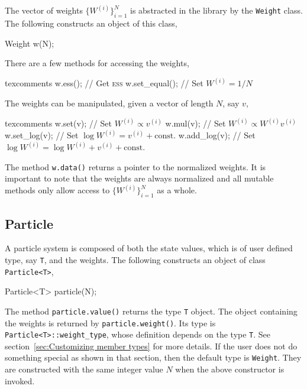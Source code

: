 The vector of weights $\{W^{(i)}\}_{i=1}^N$ is abstracted in the library by the
\verb|Weight| class. The following constructs an object of this class,
\begin{cppcode}
  Weight w(N);
\end{cppcode}
There are a few methods for accessing the weights,
\begin{cppcode*}{texcomments}
  w.ess();          // Get {\normalfont\textsc{ess}}
  w.set_equal();    // Set $W^{(i)} = 1/N$
\end{cppcode*}
The weights can be manipulated, given a vector of length $N$, say $v$,
\begin{cppcode*}{texcomments}
  w.set(v);         // Set $W^{(i)} \propto v^{(i)}$
  w.mul(v);         // Set $W^{(i)} \propto W^{(i)} v^{(i)}$
  w.set_log(v);     // Set $\log W^{(i)} = v^{(i)} + \text{const.}$
  w.add_log(v);     // Set $\log W^{(i)} = \log W^{(i)} + v^{(i)} + \text{const.}$
\end{cppcode*}
The method \verb|w.data()| returns a pointer to the normalized weights. It is
important to note that the weights are always normalized and all mutable
methods only allow access to $\{W^{(i)}\}_{i=1}^N$ as a whole.

\subsection{Particle}
\label{sub:Particle}

A particle system is composed of both the state values, which is of user
defined type, say \verb|T|, and the weights. The following constructs an object
of class \verb|Particle<T>|,
\begin{cppcode}
  Particle<T> particle(N);
\end{cppcode}
The method \verb|particle.value()| returns the type \verb|T| object. The object
containing the weights is returned by \verb|particle.weight()|. Its type is
\verb|Particle<T>::weight_type|, whose definition depends on the type \verb|T|.
See section~\ref{sec:Customizing member types} for more details. If the user
does not do something special as shown in that section, then the default type
is \verb|Weight|. They are constructed with the same integer value $N$ when the
above constructor is invoked.

